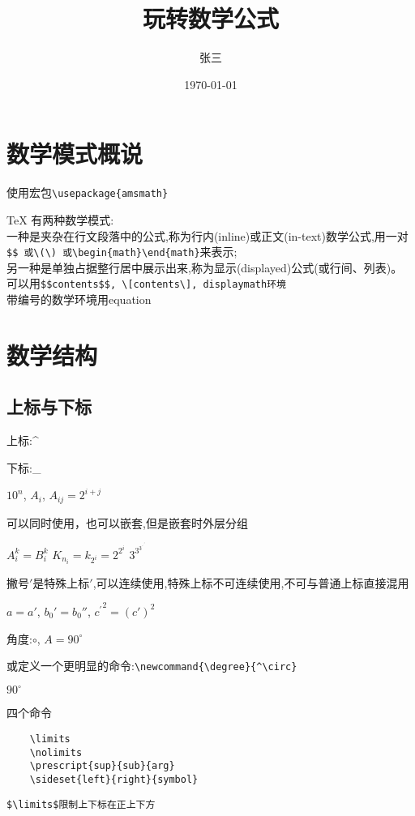 \documentclass[titlepage, hyperref, UTF8]{ctexart}
\title{玩转数学公式}
\author{张三}
\date{\today}
\begin{document}
\maketitle
\tableofcontents
\newpage

\section{数学模式概说}
使用宏包\verb|\usepackage{amsmath}|\par
\TeX{} 有两种数学模式:\\
一种是夹杂在行文段落中的公式,称为行内(inline)或正文(in-text)数学公式,用一对\verb|$$ 或\(\) 或\begin{math}\end{math}|来表示;\\
另一种是单独占据整行居中展示出来,称为显示(displayed)公式(或行间、列表)。\\
可以用\verb|$$contents$$, \[contents\], displaymath环境|\\
带编号的数学环境用equation


\section{数学结构}
\subsection{上标与下标}
上标:\^{}\par
下标:\_{}

$10^n$, $A_i$, $A_{ij} = 2^{i+j}$

可以同时使用，也可以嵌套,但是嵌套时外层分组

$A_i^k = B^k_i$ \qquad 
$K_{n_i} = k_{2^i}
		 = 2^{2^i}$\qquad
$3^{3^{3^{\cdot^{\cdot^{\cdot^3}}}}}$

撇号$\prime$是特殊上标$'$,可以连续使用,特殊上标不可连续使用,不可与普通上标直接混用

$a = a'$, $b_0' = b_0''$,
${c^\prime}^2 = (c')^2$

角度:$\circ$,
$A = 90^\circ$

或定义一个更明显的命令:\verb|\newcommand{\degree}{^\circ}|
\newcommand{\degree}{^\circ}

$90\degree$

四个命令
\begin{verbatim}
    \limits
    \nolimits
    \prescript{sup}{sub}{arg}
    \sideset{left}{right}{symbol}
\end{verbatim}

\verb|$\limits$限制上下标在正上下方|
\end{document}
